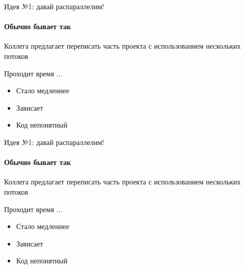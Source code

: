  \begin{frame}{Идея №1: давай распараллелим!}
 \framesubtitle{Обычно бывает так}
 
 Коллега предлагает переписать часть проекта с использованием нескольких потоков
 
 
 Проходит время ...
 
 \begin{itemize}
   \item Стало медленнее
   \item Зависает
   \item Код непонятный
 \end{itemize}
 
 \end{frame}


\begin{frame}{Идея №1: давай распараллелим!}
\framesubtitle{Обычно бывает так}

Коллега предлагает переписать часть проекта с использованием нескольких потоков



Проходит время ...

\begin{itemize}
  \item Стало медленнее
  \item Зависает
  \item Код непонятный
\end{itemize}

\end{frame}


